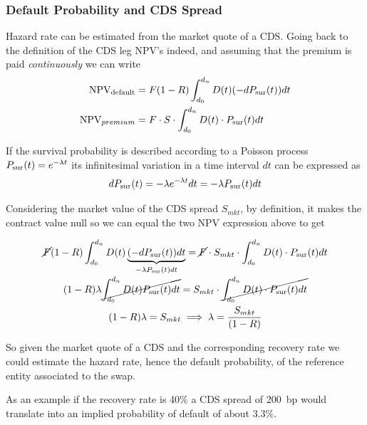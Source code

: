 \subsubsection*{Default Probability and CDS Spread}

Hazard rate can be estimated from the market quote of a CDS. Going back to the definition of the CDS leg NPV's indeed, and assuming that the premium is paid \emph{continuously} we can write
\begin{equation}
  \begin{aligned}
    \mathrm{NPV_{default}} &= F(1-R) \int_{d_0}^{d_n} D(t) (-dP_{\text{sur}}(t)) dt \\
    \textrm{NPV}_{premium} &= F\cdot S \cdot \int_{d_0}^{d_n} D(t) \cdot P_{\text{sur}}(t) dt 
  \end{aligned}
\end{equation}

If the survival probability is described according to a Poisson process $P_{\text{sur}}(t) = e^{-\lambda t}$ its infinitesimal variation in a time interval $dt$ can be expressed as
\begin{equation*}
  dP_{\text{sur}}(t) = -\lambda e^{-\lambda t} dt = -\lambda P_{\text{sur}}(t) dt 
\end{equation*}

Considering the market value of the CDS spread $S_{mkt}$, by definition, it makes the contract value null so we can equal the two NPV expression above to get

\begin{equation*}
  \begin{gathered}
    \cancel{F}(1-R) \int_{d_0}^{d_n} D(t) \underbrace{(-dP_{\text{sur}}(t)) dt}_{-\lambda  P_{\text{sur}}(t) dt} =  \cancel{F}\cdot S_{mkt} \cdot \int_{d_0}^{d_n} D(t) \cdot P_{\text{sur}}(t) dt \\
    (1-R) \lambda \cancel{\int_{d_0}^{d_n} D(t) P_{\text{sur}}(t) dt} =  S_{mkt} \cdot \cancel{\int_{d_0}^{d_n} D(t) \cdot P_{\text{sur}}(t) dt} \\
    (1-R) \lambda = S_{mkt} \implies  \lambda = \frac{ S_{mkt}}{(1-R)}
  \end{gathered}
\end{equation*}

So given the market quote of a CDS and the corresponding recovery rate we could estimate the hazard rate, hence the default probability, of the reference entity associated to the swap.

As an example if the recovery rate is 40\% a CDS spread of 200~bp would translate into an implied probability of default of about 3.3\%.

